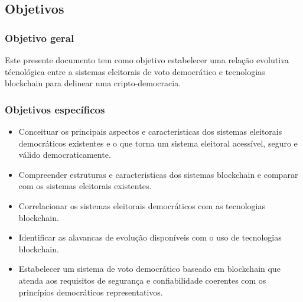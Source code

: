 \subsection{Objetivos}
\subsubsection{Objetivo geral}
Este presente documento tem como objetivo estabelecer uma relação evolutiva 
técnológica entre a sistemas eleitorais de voto democrático e tecnologias blockchain
para delinear uma cripto-democracia.
\subsubsection{Objetivos específicos}
\begin{itemize}
  \item Conceituar os principais aspectos e caracteristicas dos sistemas eleitorais democráticos
  existentes e o que torna um sistema eleitoral acessível, seguro e válido democraticamente.
  \item Compreender estruturas e caracteristicas dos sistemas blockchain e comparar com os sistemas
  eleitorais existentes.
  \item Correlacionar os sistemas eleitorais democráticos com as tecnologias blockchain.
  \item Identificar as alavancas de evolução disponíveis com o uso de tecnologias blockchain.
  \item Estabelecer um sistema de voto democrático baseado em blockchain que atenda
  aos requisitos de segurança e confiabilidade coerentes com os princípios 
  democráticos representativos.
\end{itemize} 
\clearpage
